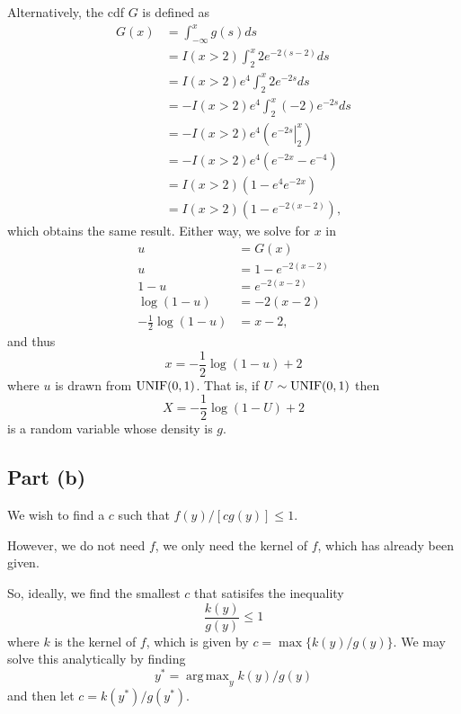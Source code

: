 \documentclass[
]{article}
\begin{document}
Alternatively, the cdf \(G\) is defined as \begin{align}
  G(x) &= \int_{-\infty}^{x} g(s) ds\\
       &= I(x > 2) \int_{2}^{x} 2 e^{−2(s−2)} ds\\
       &= I(x > 2) e^4 \int_{2}^{x} 2 e^{−2 s} ds\\
       &= -I(x > 2) e^4 \int_{2}^{x} (-2) e^{−2 s} ds\\
       &= -I(x > 2) e^4 \left(\left. e^{-2 s} \right\vert_{2}^{x}\right)\\
       &= -I(x > 2) e^4 \left(e^{-2 x}-e^{-4}\right)\\
       &= I(x > 2) (1 - e^4 e^{-2 x})\\
       &= I(x > 2) (1 - e^{-2(x-2)}),
\end{align} which obtains the same result. Either way, we solve for
\(x\) in \begin{align*}
  u           &= G(x)\\
  u           &= 1 - e^{-2(x-2)}\\
  1-u         &= e^{-2(x-2)}\\
  \log(1-u)   &= -2(x-2)\\
  -\frac{1}{2}\log(1-u) &= x-2,
\end{align*} and thus \[
  x = -\frac{1}{2}\log(1-u) + 2
\] where \(u\) is drawn from \(\rm{UNIF}(0,1)\). That is, if
\(U \sim \rm{UNIF}(0,1)\) then \[
  X = -\frac{1}{2}\log(1-U) + 2
\] is a random variable whose density is \(g\).

\hypertarget{part-b}{%
\subsection{Part (b)}\label{part-b}}


We wish to find a \(c\) such that \(f(y)/[c g(y)] ≤ 1\).

However, we do not need \(f\), we only need the kernel of \(f\), which
has already been given.

So, ideally, we find the smallest \(c\) that satisifes the inequality \[
  \frac{k(y)}{g(y)} \leq 1
\] where \(k\) is the kernel of \(f\), which is given by
\(c = \max\{k(y)/g(y)\}\). We may solve this analytically by finding \[
  y^* = \operatorname{arg\,max}_y k(y)/g(y)
\] and then let \(c = k(y^*)/g(y^*)\).
\end{document}
